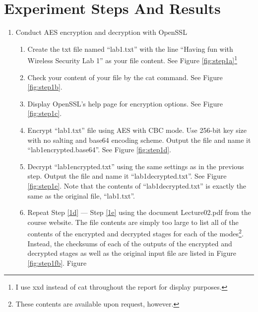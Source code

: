 \documentclass{article}
\begin{document}

\section{Experiment Steps And Results}

\begin{enumerate}
\item \label{step1} Conduct AES encryption and decryption with OpenSSL
    \begin{enumerate}
        \item \label{1a} Create the txt file named ``lab1.txt'' with the line ``Having
               fun with Wireless Security Lab 1'' as your file content. See Figure
               \ref{fig:step1a}\footnote{I use xxd instead of cat throughout the report for display purposes.}
        \item \label{1b} Check your content of your file by the cat command. See Figure
               \ref{fig:step1b}. 
        \item \label{1c} Display OpenSSL's help page for encryption options. See Figure \ref{fig:step1c}.
        \item \label{1d} Encrypt ``lab1.txt'' file using AES with CBC mode. Use 256-bit key size 
              with no salting and base64 encoding scheme. Output the file and name it
              ``lab1\textunderscore encrypted.base64''. See Figure \ref{fig:step1d}.
        \item \label{1e} Decrypt ``lab1\textunderscore encrypted.txt” using the same settings as in the previous
              step. Output the file and name it ``lab1\textunderscore decrypted.txt''.
              See Figure \ref{fig:step1e}. Note that the contents of
              ``lab1\textunderscore decrypted.txt'' is exactly the same as the original file,
              ``lab1.txt''.
        \item Repeat Step \ref{1d} --- Step \ref{1e} using the document Lecture02.pdf from the course website.
              The file contents are simply too large to list all of the contents of the encrypted and decrypted
              stages for each of the modes\footnote{These contents are available upon request, however.}.
              Instead, the checksums of each of the outputs of the encrypted and
              decrypted stages as well as the original input file are listed in Figure \ref{fig:step1fb}. Figure

\end{enumerate}
\end{enumerate}
\end{document}

